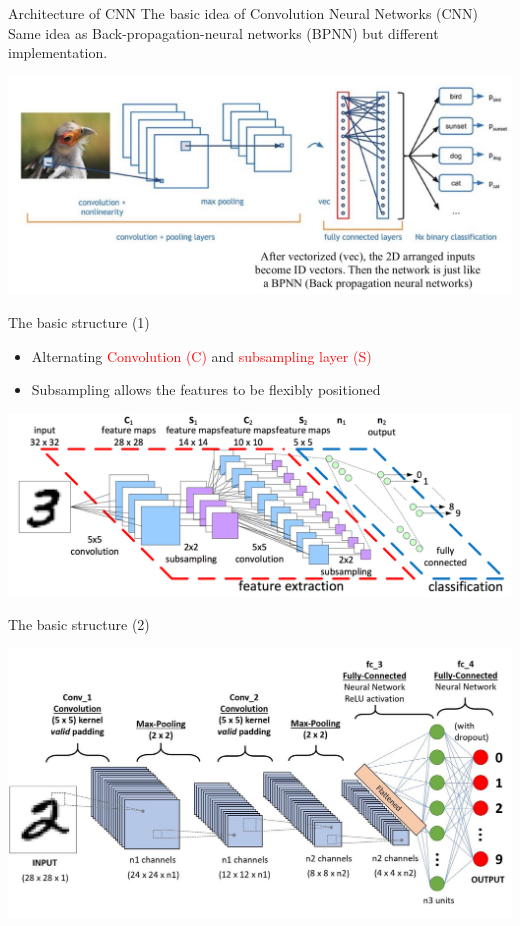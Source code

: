 \documentclass[serif, aspectratio=169]{beamer}
\begin{document}
	\begin{frame}{Architecture of CNN}
		\centering
		The basic idea of Convolution Neural Networks (CNN) Same idea as Back-propagation-neural networks (BPNN) but different implementation.
		
		\includegraphics[keepaspectratio, scale=0.5]{pic/Architecture_of_CNN.jpg}
	\end{frame}
	\begin{frame}{The basic structure (1)}
		\begin{itemize}
			\item Alternating \textcolor{red}{Convolution (C)} and \textcolor{red}{subsampling layer (S)}
			\item Subsampling allows the features to be flexibly positioned
		\end{itemize}
		\begin{center}
			\includegraphics[keepaspectratio, scale=0.23]{pic/CNN_structure_3.png}
		\end{center}
	\end{frame}
	\begin{frame}{The basic structure (2)}
		\begin{center}
			\includegraphics[keepaspectratio, scale=0.25]{pic/CNN_structure_a.jpeg}
		\end{center}
	\end{frame}
\end{document}
